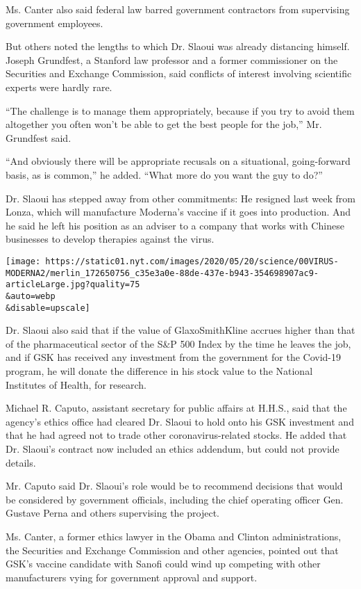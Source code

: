 Ms. Canter also said federal law barred government contractors from
supervising government employees.

But others noted the lengths to which Dr. Slaoui was already distancing
himself. Joseph Grundfest, a Stanford law professor and a former
commissioner on the Securities and Exchange Commission, said conflicts
of interest involving scientific experts were hardly rare.

``The challenge is to manage them appropriately, because if you try to
avoid them altogether you often won't be able to get the best people for
the job,'' Mr. Grundfest said.

``And obviously there will be appropriate recusals on a situational,
going-forward basis, as is common,'' he added. ``What more do you want
the guy to do?''

Dr. Slaoui has stepped away from other commitments: He resigned last
week from Lonza, which will manufacture Moderna's vaccine if it goes
into production. And he said he left his position as an adviser to a
company that works with Chinese businesses to develop therapies against
the virus.

\texttt{[image: https://static01.nyt.com/images/2020/05/20/science/00VIRUS-MODERNA2/merlin\_172650756\_c35e3a0e-88de-437e-b943-354698907ac9-articleLarge.jpg?quality=75\\\&auto=webp\\\&disable=upscale]}

Dr. Slaoui also said that if the value of GlaxoSmithKline accrues higher
than that of the pharmaceutical sector of the S\&P 500 Index by the time
he leaves the job, and if GSK has received any investment from the
government for the Covid-19 program, he will donate the difference in
his stock value to the National Institutes of Health, for research.

Michael R. Caputo, assistant secretary for public affairs at H.H.S.,
said that the agency's ethics office had cleared Dr. Slaoui to hold onto
his GSK investment and that he had agreed not to trade other
coronavirus-related stocks. He added that Dr. Slaoui's contract now
included an ethics addendum, but could not provide details.

Mr. Caputo said Dr. Slaoui's role would be to recommend decisions that
would be considered by government officials, including the chief
operating officer Gen. Gustave Perna and others supervising the project.

Ms. Canter, a former ethics lawyer in the Obama and Clinton
administrations, the Securities and Exchange Commission and other
agencies, pointed out that GSK's vaccine candidate with Sanofi could
wind up competing with other manufacturers vying for government approval
and support.

